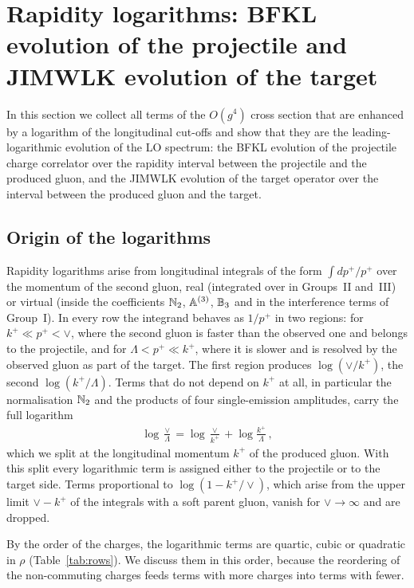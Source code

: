 \section{Rapidity logarithms: BFKL evolution of the projectile and JIMWLK evolution of the target}\label{sec:rapidity}

In this section we collect all terms of the $O(g^4)$ cross section that are enhanced by a logarithm of the longitudinal cut-offs and show that they are the leading-logarithmic evolution of the LO spectrum: the BFKL evolution of the projectile charge correlator over the rapidity interval between the projectile and the produced gluon, and the JIMWLK evolution of the target operator over the interval between the produced gluon and the target.

\subsection{Origin of the logarithms}\label{sec:loglong}

Rapidity logarithms arise from longitudinal integrals of the form $\int dp^+/p^+$ over the momentum of the second gluon, real (integrated over in Groups~II and~III) or virtual (inside the coefficients $\mathbb{N}_2$, $\mathbb{A}^{(3)}$, $\mathbb{B}_3$ and in the interference terms of Group~I). In every row the integrand behaves as $1/p^+$ in two regions: for $k^+\ll p^+<\vee$, where the second gluon is faster than the observed one and belongs to the projectile, and for $\Lambda<p^+\ll k^+$, where it is slower and is resolved by the observed gluon as part of the target. The first region produces $\log(\vee/k^+)$, the second $\log(k^+/\Lambda)$. Terms that do not depend on $k^+$ at all, in particular the normalisation $\mathbb{N}_2$ and the products of four single-emission amplitudes, carry the full logarithm
\begin{align}\label{eq:logsplit}
\log\frac{\vee}{\Lambda}=\log\frac{\vee}{k^+}+\log\frac{k^+}{\Lambda}\,,
\end{align}
which we split at the longitudinal momentum $k^+$ of the produced gluon. With this split every logarithmic term is assigned either to the projectile or to the target side. Terms proportional to $\log(1-k^+/\vee)$, which arise from the upper limit $\vee-k^+$ of the integrals with a soft parent gluon, vanish for $\vee\to\infty$ and are dropped.

By the order of the charges, the logarithmic terms are quartic, cubic or quadratic in $\rho$ (Table~\ref{tab:rows}). We discuss them in this order, because the reordering of the non-commuting charges feeds terms with more charges into terms with fewer.

